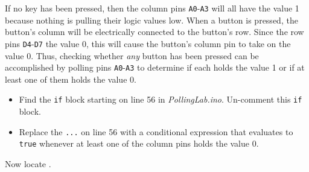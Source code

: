 If no key has been pressed, then the column pins \texttt{A0}-\texttt{A3} will
all have the value 1 because nothing is pulling their logic values low. When a
button is pressed, the button's column will be electrically connected to the
button's row. Since the row pins \texttt{D4}-\texttt{D7} the value 0, this
will cause the button's column pin to take on the value 0. Thus, checking
whether \textit{any} button has been pressed can be accomplished by polling
pins \texttt{A0}-\texttt{A3} to determine if each holds the value 1 or if at
least one of them holds the value 0.

    \begin{itemize}
    \item Find the \lstinline{if} block starting on line 56 in
        \textit{PollingLab.ino}. Un-comment this \lstinline{if} block.
        
    \item Replace the \lstinline{...} on line 56 with a conditional expression
        that evaluates to \texttt{true} whenever at least one of the column
        pins holds the value 0.
    \end{itemize}

Now locate .


